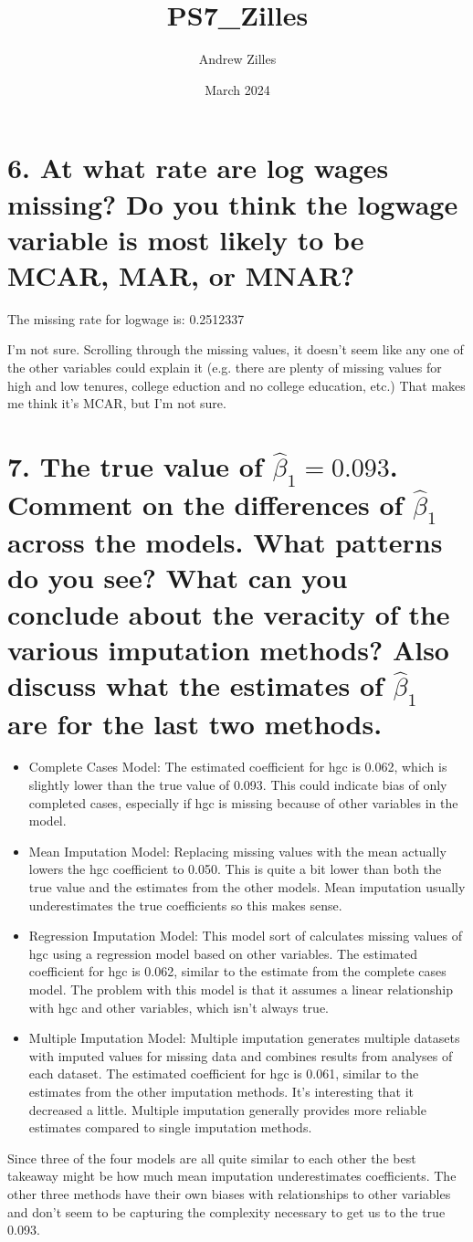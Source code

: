 \documentclass{article}
\title{PS7\_Zilles}
\author{Andrew Zilles}
\date{March 2024}
\begin{document}
\maketitle

\section*{6. At what rate are log wages missing? Do you think the logwage variable is most likely to be MCAR, MAR, or MNAR?}
The missing rate for logwage is: 0.2512337 

I'm not sure. Scrolling through the missing values, it doesn't seem like any one of the other variables could explain it (e.g. there are plenty of missing values for high and low tenures, college eduction and no college education, etc.) That makes me think it's MCAR, but I'm not sure.

\section*{7.  The true value of $\hat{\beta}_{1}=0.093$. Comment on the differences of $\hat{\beta}_{1}$ across the models. What patterns do you see? What can you conclude about the veracity of the various imputation methods? Also discuss what the estimates of $\hat{\beta}_{1}$ are for the last two methods.}

\begin{itemize}
    \item Complete Cases Model: The estimated coefficient for hgc is 0.062, which is slightly lower than the true value of 0.093. This could indicate bias of only completed cases, especially if hgc is missing because of other variables in the model.
    \item Mean Imputation Model: Replacing missing values with the mean actually lowers the hgc coefficient to 0.050. This is quite a bit lower than both the true value and the estimates from the other models. Mean imputation usually underestimates the true coefficients so this makes sense.
    \item Regression Imputation Model: This model sort of calculates missing values of hgc using a regression model based on other variables. The estimated coefficient for hgc is 0.062, similar to the estimate from the complete cases model. The problem with this model is that it assumes a linear relationship with hgc and other variables, which isn't always true.
    \item Multiple Imputation Model: Multiple imputation generates multiple datasets with imputed values for missing data and combines results from analyses of each dataset. The estimated coefficient for hgc is 0.061, similar to the estimates from the other imputation methods. It's interesting that it decreased a little. Multiple imputation generally provides more reliable estimates compared to single imputation methods.
\end{itemize}
Since three of the four models are all quite similar to each other the best takeaway might be how much mean imputation underestimates coefficients. The other three methods have their own biases with relationships to other variables and don't seem to be capturing the complexity necessary to get us to the true 0.093. 
\end{document}
